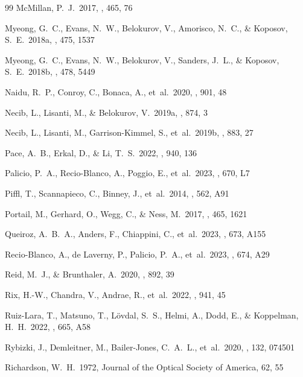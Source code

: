 \documentclass{aa}  %
\begin{document}
\begin{thebibliography}{99}
McMillan, P.~J.\ 2017, \mnras, 465, 76

Myeong, G.~C., Evans, N.~W., Belokurov, V., Amorisco, N.~C., \&
Koposov, S.~E.\ 2018a, \mnras, 475, 1537

Myeong, G.~C., Evans, N.~W., Belokurov, V., Sanders, J.~L., \&
Koposov, S.~E.\ 2018b, \mnras, 478, 5449

Naidu, R.~P., Conroy, C., Bonaca, A., et~al.\ 2020, \apj, 901, 48

Necib, L., Lisanti, M., \& Belokurov, V.\ 2019a, \apj, 874, 3

Necib, L., Lisanti, M., Garrison-Kimmel, S., et~al.\ 2019b,
\apj, 883, 27

Pace, A.~B., Erkal, D., \& Li, T.~S.\ 2022, \apj, 940, 136

Palicio, P.~A., Recio-Blanco, A., Poggio, E., et~al.\ 2023, \aap, 670, L7

Piffl, T., Scannapieco, C., Binney, J., et~al.\ 2014, \aap, 562, A91

Portail, M., Gerhard, O., Wegg, C., \& Ness, M.\ 2017, \mnras, 465, 1621

Queiroz, A.~B.~A., Anders, F., Chiappini, C., et~al.\ 2023, \aap,
673, A155

Recio-Blanco, A., de Laverny, P., Palicio, P.~A., et~al.\ 2023,
\aap, 674, A29

Reid, M.~J., \& Brunthaler, A.\ 2020, \apj, 892, 39

Rix, H.-W., Chandra, V., Andrae, R., et~al.\ 2022, \apj, 941, 45

Ruiz-Lara, T., Matsuno, T., L\"ovdal, S.~S., Helmi, A., Dodd, E., \&
Koppelman, H.~H.\ 2022, \aap, 665, A58

Rybizki, J., Demleitner, M., Bailer-Jones, C.~A.~L., et~al.\ 2020,
\pasp, 132, 074501

Richardson, W.~H.\ 1972, Journal of the Optical Society of America,
62, 55


\end{thebibliography}
\end{document}
